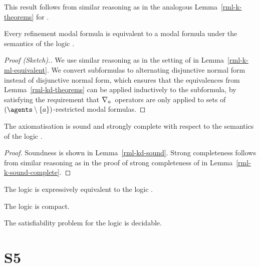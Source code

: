 This result follows from similar reasoning as in the analogous Lemma~\ref{rml-k-theorems} for \axiomRmlK{}.

\begin{lemma}
Every refinement modal formula is equivalent to a modal formula under the semantics of the logic \logicRmlKD{}.
\end{lemma}

\begin{proof}[Proof (Sketch).]
We use similar reasoning as in the setting of \logicRmlK{} in Lemma~\ref{rml-k-ml-equivalent}.
We convert subformulas to alternating disjunctive normal form instead of disjunctive normal form, which ensures that the equivalences from Lemma~\ref{rml-kd-theorems} can be applied inductively to the subformula, by satisfying the requirement that $\nabla_{a}$~operators  are only applied to sets of $(\agents \setminus \{\agentA\})$-restricted modal formulas.
\end{proof}

\begin{theorem}
The axiomatisation \axiomRmlKD{} is sound and strongly complete with respect to the semantics of the logic \logicRmlKD{}.
\end{theorem}

\begin{proof}
Soundness is shown in Lemma~\ref{rml-kd-sound}.
Strong completeness follows from similar reasoning as in the proof of strong completeness of \axiomRmlK{} in Lemma~\ref{rml-k-sound-complete}.
\end{proof}

\begin{corollary}
The logic \logicRmlKD{} is expressively equivalent to the logic \logicKD{}.
\end{corollary}

\begin{corollary}
The logic \logicRmlKD{} is compact.
\end{corollary}

\begin{corollary}
The satisfiability problem for the logic \logicRmlKD{} is decidable.
\end{corollary}

\section{S5}

